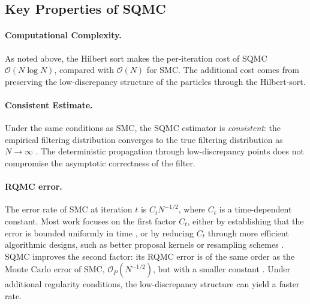 \subsection{Key Properties of SQMC}
\label{sec:sqmc-properties}

\paragraph{Computational Complexity.}
As noted above, the Hilbert sort makes the per-iteration cost of SQMC $\mathcal{O}(N \log N)$, compared with $\mathcal{O}(N)$ for SMC. The additional cost comes from preserving the low-discrepancy structure of the particles through the Hilbert-sort.

\paragraph{Consistent Estimate.}
Under the same conditions as SMC, the SQMC estimator is \textit{consistent}: the empirical filtering distribution converges to the true filtering distribution as $N \to \infty$ \citep{chopingerber2015sqmc}. The deterministic propagation through low-discrepancy points does not compromise the asymptotic correctness of the filter.

\paragraph{RQMC error.}
The error rate of SMC at iteration $t$ is $C_t N^{-1/2}$, where $C_t$ is a time-dependent constant. Most work focuses on the first factor $C_t$, either by establishing that the error is bounded uniformly in time \citep{delmoral2004feynman,whiteley2013stability}, or by reducing $C_t$ through more efficient algorithmic designs, such as better proposal kernels or resampling schemes \citep{delmoraldoucetjasra2012smcsamplers}. SQMC improves the second factor: its RQMC error is of the same order as the Monte Carlo error of SMC, $\mathcal{O}_P(N^{-1/2})$, but with a smaller constant \citep{chopingerber2015sqmc}. Under additional regularity conditions, the low-discrepancy structure can yield a faster rate.


